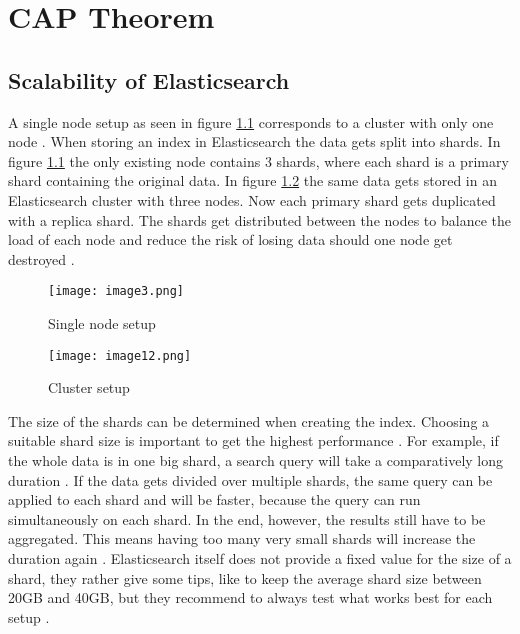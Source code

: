 \chapter{CAP Theorem}

\section{Scalability of Elasticsearch}
A single node setup as seen in figure \ref{fig:singlenodesetup} corresponds to a cluster with only one node \autocite{elastic2019_10}. When storing an index in Elasticsearch the data gets split into shards. In figure \ref{fig:singlenodesetup} the only existing node contains 3 shards, where each shard is a primary shard containing the original data. In figure \ref{fig:clustersetup} the same data gets stored in an Elasticsearch cluster with three nodes. Now each primary shard gets duplicated with a replica shard. The shards get distributed between the nodes to balance the load of each node and reduce the risk of losing data should one node get destroyed \autocite{elastic2019_10}.

\begin{figure}[H]
    \centering
    \texttt{[image: image3.png]}
    \caption{Single node setup \autocite{elastic2019_09}}
    \label{fig:singlenodesetup}
\end{figure}

\begin{figure}[H]
    \centering
    \texttt{[image: image12.png]}
    \caption{Cluster setup \autocite{elastic2019_09}}
    \label{fig:clustersetup}
\end{figure}

The size of the shards can be determined when creating the index. Choosing a suitable shard size is important to get the highest performance \autocite{dahlqvistc2018}. For example, if the whole data is in one big shard, a search query will take a comparatively long duration \autocite{dahlqvistc2018}. If the data gets divided over multiple shards, the same query can be applied to each shard and will be faster, because the query can run simultaneously on each shard. In the end, however, the results still have to be aggregated. This means having too many very small shards will increase the duration again \autocite{dahlqvistc2018}. Elasticsearch itself does not provide a fixed value for the size of a shard, they rather give some tips, like to keep the average shard size between 20GB and 40GB, but they recommend to always test what works best for each setup \autocite{dahlqvistc2018}.


